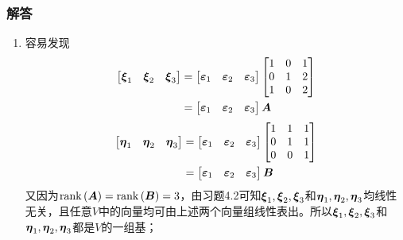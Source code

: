 \documentclass{beamer}
\begin{document}
\begin{frame}[allowframebreaks]
    \frametitle{解答}
    \begin{enumerate}
        \item {
              容易发现
              \begin{align*}
                  \begin{bmatrix}\boldsymbol{\xi}_1&\boldsymbol{\xi}_2&\boldsymbol{\xi}_3\end{bmatrix}
                   & =
                  \begin{bmatrix}\boldsymbol{\varepsilon}_1&\boldsymbol{\varepsilon}_2&\boldsymbol{\varepsilon}_3\end{bmatrix}
                  \begin{bmatrix}
                      1 & 0 & 1 \\
                      0 & 1 & 2 \\
                      1 & 0 & 2
                  \end{bmatrix}                                                        \\
                   & =\begin{bmatrix}\boldsymbol{\varepsilon}_1&\boldsymbol{\varepsilon}_2&\boldsymbol{\varepsilon}_3\end{bmatrix}\boldsymbol{A}
              \end{align*}
              \begin{align*}
                  \begin{bmatrix}\boldsymbol{\eta}_1&\boldsymbol{\eta}_2&\boldsymbol{\eta}_3\end{bmatrix}
                   & =
                  \begin{bmatrix}\boldsymbol{\varepsilon}_1&\boldsymbol{\varepsilon}_2&\boldsymbol{\varepsilon}_3\end{bmatrix}
                  \begin{bmatrix}
                      1 & 1 & 1 \\
                      0 & 1 & 1 \\
                      0 & 0 & 1
                  \end{bmatrix}                                                        \\
                   & =\begin{bmatrix}\boldsymbol{\varepsilon}_1&\boldsymbol{\varepsilon}_2&\boldsymbol{\varepsilon}_3\end{bmatrix}\boldsymbol{B}
              \end{align*}
              又因为\(\mathrm{rank}\left( \boldsymbol{A} \right)=\mathrm{rank}\left( \boldsymbol{B} \right)=3\)，由习题4.2可知\(\boldsymbol{\xi}_1,\boldsymbol{\xi}_2,\boldsymbol{\xi}_3\)和\(\boldsymbol{\eta}_1,\boldsymbol{\eta}_2,\boldsymbol{\eta}_3\)均线性无关，且任意\(V\)中的向量均可由上述两个向量组线性表出。所以\(\boldsymbol{\xi}_1,\boldsymbol{\xi}_2,\boldsymbol{\xi}_3\)和\(\boldsymbol{\eta}_1,\boldsymbol{\eta}_2,\boldsymbol{\eta}_3\)都是\(V\)的一组基；
}
\end{enumerate}
\end{frame}
\end{document}

